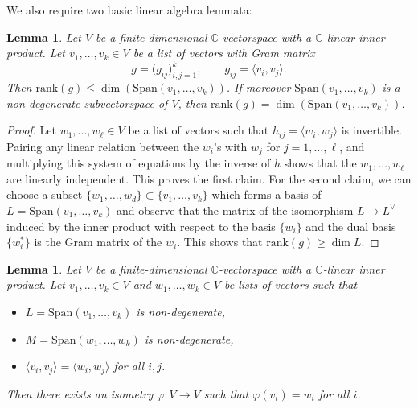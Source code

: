 \documentclass[11pt]{article}
\numberwithin{equation}{section}
\numberwithin{equation}{section}
\newtheorem{Lemma}[Theorem]{Lemma}
\newcommand{\BC}{{\mathbb{C}}}
\newcommand{\1}{\mathsf{1}}
\begin{document}
We also require two basic linear algebra lemmata:
\begin{Lemma} \label{lemma:la1}
Let $V$ be a finite-dimensional $\BC$-vectorspace with a $\BC$-linear inner product.
Let $v_1, \dots, v_k \in V$ be a list of vectors with Gram matrix
\[
g = \big( g_{ij} \big)_{i,j=1}^{k}, \qquad g_{ij} = \langle v_i, v_j \rangle.
 \]
Then $\mathrm{rank}(g) \leq \dim( \mathrm{Span}(v_1, \dots, v_k))$.
If moreover $\mathrm{Span}(v_1, \dots, v_k)$ is a non-degenerate subvectorspace of $V$, then
$\mathrm{rank}(g) = \dim( \mathrm{Span}(v_1, \dots, v_k))$.
\end{Lemma}
\begin{proof}
Let $w_1, \dots, w_{\ell} \in V$ be a list of vectors such that $h_{ij}=\langle w_i, w_j \rangle$ is invertible.
Pairing any linear relation between the $w_i$'s with $w_j$ for $j=1,\dots, \ell$,
and multiplying this system of equations by the inverse of $h$
shows that the $w_1, \dots, w_{\ell}$ are linearly independent.
This proves the first claim.
For the second claim, we can choose a subset $\{ w_1, \dots, w_d \} \subset \{ v_1, \dots, v_k \}$ which forms a basis of $L = \mathrm{Span}(v_1, \dots, v_k)$
and observe that the matrix of the isomorphism $L \to L^{\vee}$ induced by the inner product
with respect to the basis $\{ w_i \}$ and the dual basis $\{ w_i^{\ast} \}$
is the Gram matrix of the $w_i$.
This shows that $\mathrm{rank}(g) \geq \dim L$.
\end{proof}
\begin{Lemma} \label{lemma:a2}
Let $V$ be a finite-dimensional $\BC$-vectorspace with a $\BC$-linear inner product.
Let $v_1, \dots, v_k \in V$ and $w_1, \dots, w_k \in V$ be lists of vectors such that
\begin{itemize}\itemsep=0pt
\item[$(i)$] $L = \mathrm{Span}(v_1, \dots, v_k)$ is non-degenerate,
\item[$(ii)$] $M = \mathrm{Span}(w_1, \dots, w_k)$ is non-degenerate,
\item[$(iii)$] $\langle v_i, v_j \rangle = \langle w_i, w_j \rangle$ for all $i,j$.
\end{itemize}
Then there exists an isometry $\varphi \colon V \to V$ such that $\varphi(v_i) = w_i$ for all $i$.
\end{Lemma}
\end{document}
